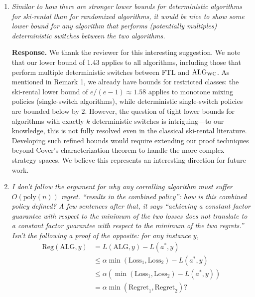 \documentclass[11pt]{article}
\begin{document}
\begin{enumerate}
``"

\item \emph{Similar to how there are stronger lower bounds for deterministic algorithms for ski-rental than for randomized algorithms, it would be nice to show some lower bound for any algorithm that performs (potentially multiples) deterministic switches between the two algorithms.}

{\bf Response.} We thank the reviewer for this interesting suggestion. We note that our lower bound of 1.43 applies to all algorithms, including those that perform multiple deterministic switches between FTL and $\text{ALG}_{\text{WC}}$.
As mentioned in Remark 1, we already have bounds for restricted classes: the ski-rental lower bound of $e/(e-1) \approx 1.58$ applies to monotone mixing policies (single-switch algorithms), while deterministic single-switch policies are bounded below by $2$. However, the question of tight lower bounds for algorithms with exactly $k$ deterministic switches is intriguing---to our knowledge, this is not fully resolved even in the classical ski-rental literature.
Developing such refined bounds would require extending our proof techniques beyond Cover's characterization theorem to handle the more complex strategy spaces. We believe this represents an interesting direction for future work.



\item  \emph{I don’t follow the argument for why any corralling algorithm must suffer $O(\text{poly}(n))$ regret. “results in the combined policy”: how is this combined policy defined? A few sentences after that, it says “achieving a constant factor guarantee with respect to the minimum of the two losses does not translate to a constant factor guarantee with respect to the minimum of the two regrets.” Isn’t the following a proof of the opposite: for any instance $y$, 
\begin{align}
    \text{Reg}(\text{ALG}, y) &= L(\text{ALG}, y) - L(a^*, y) \nonumber \\
   &\le \alpha \min(\text{Loss}_1, \text{Loss}_2) - L(a^*, y) \label{eq:AddRegret}\\
    &\le \alpha (\min(\text{Loss}_1, \text{Loss}_2) - L(a^*, y))  \label{eq:LStarge0}\\
    &= \alpha \min(\text{Regret}_1, \text{Regret}_2)? \nonumber
\end{align}}


\end{enumerate}
\end{document}
